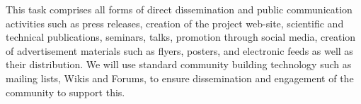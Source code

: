 \begin{task}[
  title=Dissemination and communication activities,
  id=Website,
  lead=SRL,
  PM=2,
  wphases={0-36!.027},
  partners={MP,UIO,QS}
]

This task comprises all forms of direct dissemination and public communication
activities such as press releases, creation of the project web-site, scientific
and technical publications, seminars, talks, promotion through social media,
creation of advertisement materials such as flyers, posters, and electronic
feeds as well as their distribution. We will use standard community building
technology such as mailing lists, Wikis and Forums, to ensure dissemination and
engagement of the community to support this.

\end{task}
